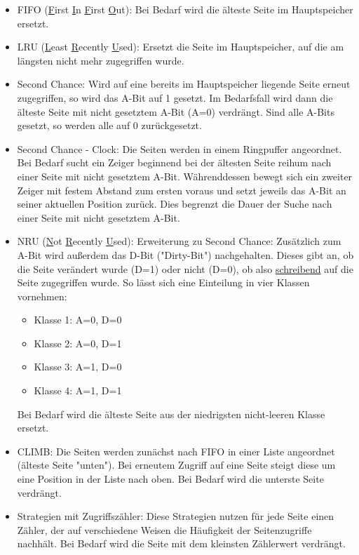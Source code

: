 \documentclass[11pt]{scrartcl}
\begin{document}
\begin{itemize}
	\item{FIFO (\underline First \underline In \underline First \underline Out): Bei Bedarf wird die älteste Seite im Hauptspeicher ersetzt.}
	\item{LRU (\underline Least \underline Recently \underline Used): Ersetzt die Seite im Hauptspeicher, auf die am längsten nicht mehr zugegriffen wurde.}
	\item{Second Chance: Wird auf eine bereits im Hauptspeicher liegende Seite erneut zugegriffen, so wird das A-Bit auf 1 gesetzt. Im Bedarfsfall wird dann die älteste Seite mit nicht gesetztem A-Bit (A=0) verdrängt. Sind alle A-Bits gesetzt, so werden alle auf 0 zurückgesetzt.}
	\item{Second Chance - Clock: Die Seiten werden in einem Ringpuffer angeordnet. Bei Bedarf sucht ein Zeiger beginnend bei der ältesten Seite reihum nach einer Seite mit nicht gesetztem A-Bit. Währenddessen bewegt sich ein zweiter Zeiger mit festem Abstand zum ersten voraus und setzt jeweils das A-Bit an seiner aktuellen Position zurück. Dies begrenzt die Dauer der Suche nach einer Seite mit nicht gesetztem A-Bit.}
	\item{NRU (\underline Not \underline Recently \underline Used): Erweiterung zu Second Chance: Zusätzlich zum A-Bit wird außerdem das D-Bit ("Dirty-Bit") nachgehalten. Dieses gibt an, ob die Seite verändert wurde (D=1) oder nicht (D=0), ob also \underline{schreibend} auf die Seite zugegriffen wurde. So lässt sich eine Einteilung in vier Klassen vornehmen:
    \begin{itemize}
    	\item{Klasse 1: A=0, D=0}
        \item{Klasse 2: A=0, D=1}
        \item{Klasse 3: A=1, D=0}
        \item{Klasse 4: A=1, D=1}
    \end{itemize}
    Bei Bedarf wird die älteste Seite aus der niedrigsten nicht-leeren Klasse ersetzt.}
	\item{CLIMB: Die Seiten werden zunächst nach FIFO in einer Liste angeordnet (älteste Seite "{}unten"{}). Bei erneutem Zugriff auf eine Seite steigt diese um eine Position in der Liste nach oben. Bei Bedarf wird die unterste Seite verdrängt.}
	\item{Strategien mit Zugriffszähler: Diese Strategien nutzen für jede Seite einen Zähler, der auf verschiedene Weisen die Häufigkeit der Seitenzugriffe nachhält. Bei Bedarf wird die Seite mit dem kleinsten Zählerwert verdrängt.
}
\end{itemize}
\end{document}
